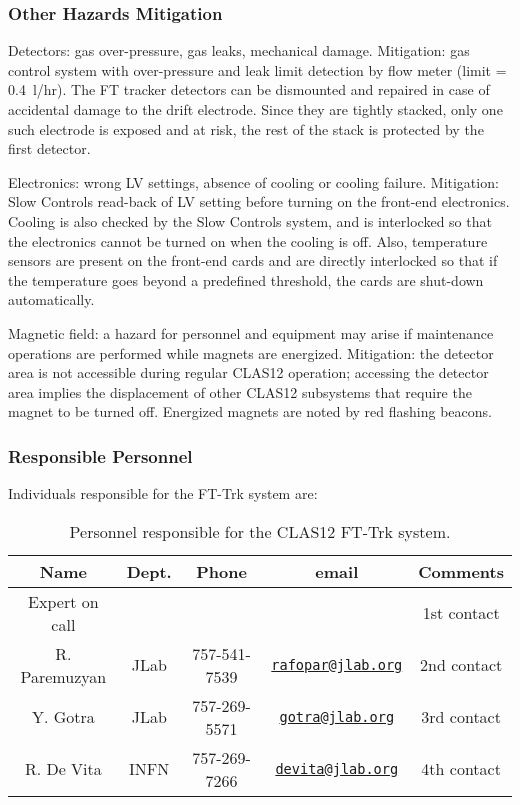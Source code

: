 \subsubsection{Other Hazards Mitigation}

Detectors: gas over-pressure, gas leaks, mechanical damage. Mitigation: gas control system with 
over-pressure and leak limit detection by flow meter (limit = 0.4~l/hr). The FT tracker detectors 
can be dismounted and repaired in case of accidental damage to the drift electrode. Since they are 
tightly stacked, only one such electrode is exposed and at risk, the rest of the stack is protected 
by the first detector.

Electronics: wrong LV settings, absence of cooling or cooling failure. Mitigation: Slow Controls 
read-back of LV setting before turning on the front-end electronics. Cooling is also checked by 
the Slow Controls system, and is interlocked so that the electronics cannot be turned on when the 
cooling is off. Also, temperature sensors are present on the front-end cards and are directly 
interlocked so that if the temperature goes beyond a predefined threshold, the cards are shut-down 
automatically.

Magnetic field: a hazard for personnel and equipment may arise if maintenance operations are 
performed while magnets are energized. Mitigation: the detector area is not accessible during 
regular CLAS12 operation; accessing the detector area implies the displacement of other CLAS12 
subsystems that require the magnet to be turned off. Energized magnets are noted by red flashing 
beacons.

\subsubsection{Responsible Personnel}

Individuals responsible for the FT-Trk system are:

\begin{table}[!htb]
\centering
\begin{tabular}{|c|c|c|c|c|} \hline
Name&Dept.&Phone&email&Comments \\ \hline
Expert on call& &&& 1st contact \\ \hline
R. Paremuzyan&JLab&757-541-7539&\href{mailto:rafopar@jlab.org}{\nolinkurl{rafopar@jlab.org}}&2nd contact \\ \hline
Y. Gotra&JLab&757-269-5571&\href{mailto:gotra@jlab.org}{\nolinkurl{gotra@jlab.org}}&3rd contact \\ \hline
R. De Vita&INFN&757-269-7266&\href{mailto:devita@jlab.org}{\nolinkurl{devita@jlab.org}}&4th contact \\ \hline
\end{tabular}
\caption{Personnel responsible for the CLAS12 FT-Trk system.} 
\label{tb:trk}
\end{table}
